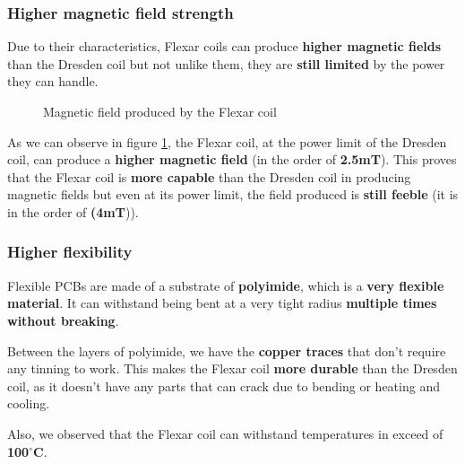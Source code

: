\subsubsection{Higher magnetic field strength}
Due to their characteristics, Flexar coils can produce \textbf{higher magnetic fields} than the Dresden coil but not unlike them, they are \textbf{still limited} by the power they can handle.
\begin{figure}[H]
    \centering
    \resizebox{0.5\textwidth}{!}{ 
        
    }
    \caption{Magnetic field produced by the Flexar coil}
    \label{fig: Flexar_magnetic_field_vs_P}
\end{figure}

As we can observe in figure \ref{fig: Flexar_magnetic_field_vs_P}, the Flexar coil, at the power limit of the Dresden coil, can produce a \textbf{higher magnetic field} (in the order of \textbf{2.5mT}).
This proves that the Flexar coil is \textbf{more capable} than the Dresden coil in producing magnetic fields but even at its power limit, the field produced is \textbf{still feeble} (it is in the order of \textbf(\textbf{4mT})).

\subsubsection{Higher flexibility}
Flexible PCBs are made of a substrate of \textbf{polyimide}, which is a \textbf{very flexible material}.
It can withstand being bent at a very tight radius \textbf{multiple times without breaking}.

Between the layers of polyimide, we have the \textbf{copper traces} that don't require any tinning to work.
This makes the Flexar coil \textbf{more durable} than the Dresden coil, as it doesn't have any parts that can crack due to bending or heating and cooling.

Also, we observed that the Flexar coil can withstand temperatures in exceed of \textbf{100$^{\circ}$C}.

